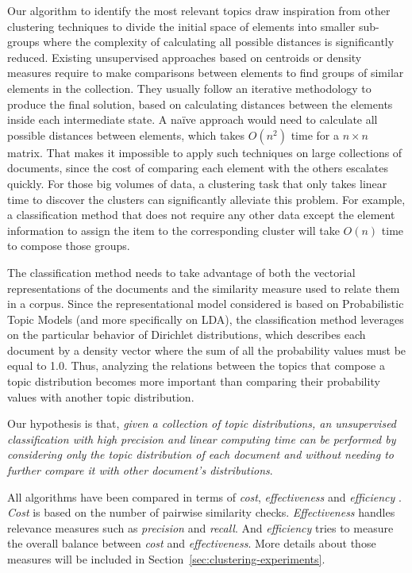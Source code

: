 Our algorithm to identify the most relevant topics draw inspiration from other clustering techniques to divide the initial space of elements into smaller sub-groups where the complexity of calculating all possible distances is significantly reduced. Existing unsupervised approaches based on centroids or density measures require to make comparisons between elements to find groups of similar elements in the collection. They usually follow an iterative methodology to produce the final solution, based on calculating distances between the elements inside each intermediate state. A na{\"i}ve approach would need to calculate all possible distances between elements, which takes $O(n^2)$ time for a $n \times n$ matrix. That makes it impossible to apply such techniques on large collections of documents, since the cost of comparing each element with the others escalates quickly. For those big volumes of data, a clustering task that only takes linear time to discover the clusters can significantly alleviate this problem. For example, a classification method that does not require any other data except the element information to assign the item to the corresponding cluster will take $O(n)$ time to compose those groups.

The classification method needs to take advantage of both the vectorial representations of the documents and the similarity measure used to relate them in a corpus. Since the representational model considered is based on Probabilistic Topic Models (and more specifically on LDA), the classification method leverages on the particular behavior of Dirichlet distributions, which describes each document by a density vector where the sum of all the probability values must be equal to 1.0. Thus, analyzing the relations between the topics that compose a topic distribution becomes more important than comparing their probability values with another topic distribution.

Our hypothesis is that, \textit{given a collection of topic distributions, an unsupervised classification with high precision and linear computing time can be performed by considering only the topic distribution of each document and without needing to further compare it with other document's distributions}.

All algorithms have been compared in terms of \textit{cost}, \textit{effectiveness} and \textit{efficiency} \citep{Halkidi2001a}. \textit{Cost} is based on the number of pairwise similarity checks. \textit{Effectiveness} handles relevance measures such as \textit{precision} and \textit{recall}. And \textit{efficiency} tries to measure the overall balance between \textit{cost} and \textit{effectiveness}. More details about those measures will be included in Section~\ref{sec:clustering-experiments}.

